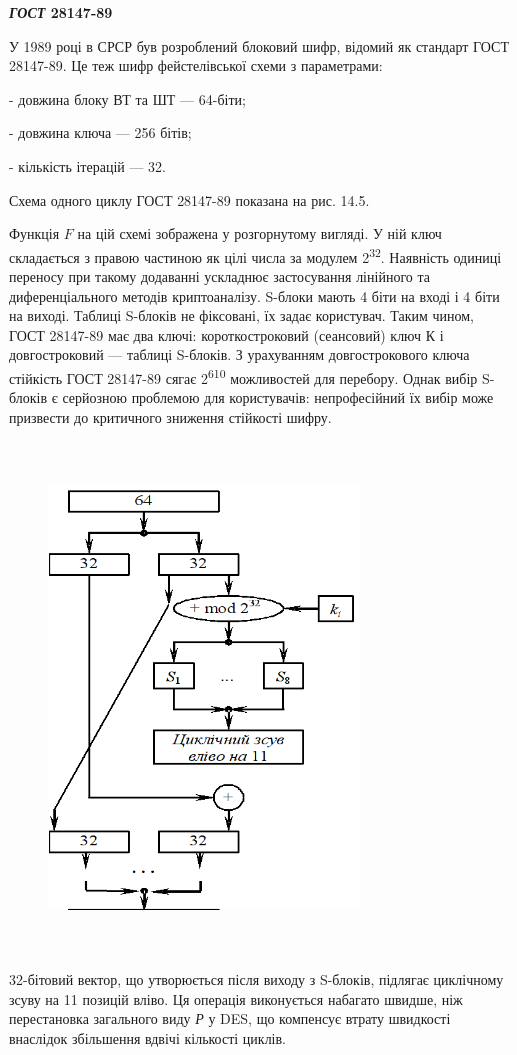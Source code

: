\bigskip


\bigskip

{\centering\bfseries
\textit{ГОСТ }28147-89
\par}


\bigskip

У 1989 році в СРСР був розроблений блоковий шифр, відомий як стандарт ГОСТ
28147-89. Це теж шифр фейстелівської схеми з параметрами:

 {}- довжина блоку ВТ та ШТ --- 64-біти; 

 {}-  довжина ключа --- 256 бітів;

 {}-  кількість ітерацій --- 32.

 Схема одного циклу\textit{ }ГОСТ\textit{ }28147-89 показана на рис. 14.5. 

Функція  ${F}$ на цій схемі зображена  у розгорнутому вигляді. У ній ключ
складається з правою частиною як цілі числа за модулем 2\textsuperscript{32}.
Наявність одиниці переносу при такому додаванні ускладнює застосування
лінійного та диференціального методів криптоаналізу. S-блоки мають 4 біти на
вході і 4 біти на  виході. Таблиці S-блоків не фіксовані, їх задає користувач.
Таким чином, ГОСТ 28147-89 має два ключі: короткостроковий (сеансовий) ключ К і
довгостроковий --- таблиці S-блоків. З урахуванням довгострокового ключа
стійкість ГОСТ 28147-89 сягає  2\textsuperscript{610 } можливостей  для 
перебору.  Однак вибір S-блоків є серйозною проблемою для користувачів:
непрофесійний їх вибір може призвести до критичного зниження стійкості шифру.

\begin{figure}
\centering
\includegraphics[width=3.2319in,height=5.3154in]{crypt-img/crypt-img298.png}
\end{figure}
32-бітовий вектор, що утворюється після виходу з S-блоків, підлягає циклічному
зсуву на 11 позицій вліво. Ця операція виконується набагато швидше, ніж
перестановка загального виду \textit{Р} у DES, що компенсує втрату швидкості
внаслідок збільшення вдвічі кількості циклів.

